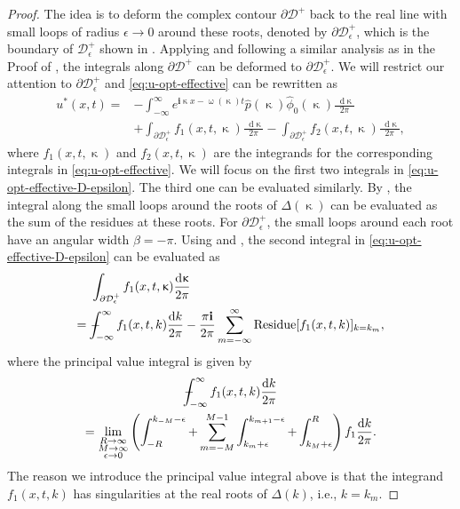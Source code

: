 \documentclass[journal,twoside,web]{ieeecolor}
\newcommand{\D}{\mathcal{D}}
\newcommand{\state}{\phi}
\newcommand{\statehat}{\hat{\state}}
\newcommand{\im}{\mathbf{i}}
\newcommand*\diff{\mathop{}\!\mathrm{d}}
\newcommand{\wcomplex}{\upomega}
\newcommand{\kcomplex}{\upkappa}
\def\Xint#1{\mathchoice
	{\XXint\displaystyle\textstyle{#1}}%
	{\XXint\textstyle\scriptstyle{#1}}%
	{\XXint\scriptstyle\scriptscriptstyle{#1}}%
	{\XXint\scriptscriptstyle\scriptscriptstyle{#1}}%
	\!\int}
\def\XXint#1#2#3{{\setbox0=\hbox{$#1{#2#3}{\int}$}
		\vcenter{\hbox{$#2#3$}}\kern-.5\wd0}}
\def\dashint{\Xint-}
\begin{document}
\begin{proof}
The idea is to deform the complex contour $\partial\D^+$ back to the real line with small loops of radius $\epsilon\to0$ around these roots, denoted by $\partial\D_\epsilon^+$, which is the boundary of $\D_\epsilon^+$ shown in .
Applying  and following a similar analysis as in the Proof of , the integrals along $\partial\D^+$ can be deformed to $\partial\D_\epsilon^+$.
We will restrict our attention to $\partial\D_\epsilon^+$ and \eqref{eq:u-opt-effective} can be rewritten as
\begin{equation}\label{eq:u-opt-effective-D-epsilon}
	\begin{aligned}
		u^*(x,t) = &-\int_{-\infty}^{\infty}e^{\im \kcomplex x - \wcomplex(\kcomplex)t} \hat{p}(\kcomplex)\statehat_0(\kcomplex) \frac{\diff \kcomplex}{2\pi}\\
		&+ \int_{\partial\D_\epsilon^+}f_1(x,t,\kcomplex)\frac{\diff \kcomplex}{2\pi} - \int_{\partial\D_\epsilon^+}f_2(x,t,\kcomplex)\frac{\diff \kcomplex}{2\pi},
	\end{aligned}
\end{equation}
where $f_1(x,t,\kcomplex)$ and $f_2(x,t,\kcomplex)$ are the integrands for the corresponding integrals in \eqref{eq:u-opt-effective}.
We will focus on the first two integrals in \eqref{eq:u-opt-effective-D-epsilon}. 
The third one can be evaluated similarly.
By , the integral along the small loops around the roots of $\Delta(\kcomplex)$ can be evaluated as the sum of the residues at these roots.
For $\partial\D_\epsilon^+$, the small loops around each root have an angular width $\beta=-\pi$. 
Using  and , the second integral in \eqref{eq:u-opt-effective-D-epsilon} can be evaluated as 
\begin{equation}\label{eq:principle-value-integral-and-residue}
	\begin{aligned}
		&\int_{\partial\D_\epsilon^+}f_1(x,t,\kcomplex)\frac{\diff \kcomplex}{2\pi}\\
		=\ &\dashint_{-\infty}^{\infty}f_1(x,t,k)\dfrac{\diff k}{2\pi} - \frac{\pi\im}{2\pi}\sum_{m=-\infty}^{\infty} \text{Residue}[f_1(x,t,k)]_{k=k_m},
	\end{aligned}
\end{equation}
where the principal value integral is given by
\begin{multline*}
	\dashint_{-\infty}^{\infty}f_1(x,t,k)\dfrac{\diff k}{2\pi} \\= \lim_{\substack{R\to\infty\\ M\to\infty\\\epsilon\to0}}
	\left(
		\int_{-R}^{k_{-M}-\epsilon} + \sum_{m=-M}^{M-1}\int_{k_{m}+\epsilon}^{k_{m+1}-\epsilon}
		+\int_{k_M+\epsilon}^{R}
	\right)f_1 \dfrac{\diff k}{2\pi}.
\end{multline*}
The reason we introduce the principal value integral above is that the integrand $f_1(x,t,k)$ has singularities at the real roots of $\Delta(k)$, i.e., $k=k_m$.


\end{proof}
\end{document}
